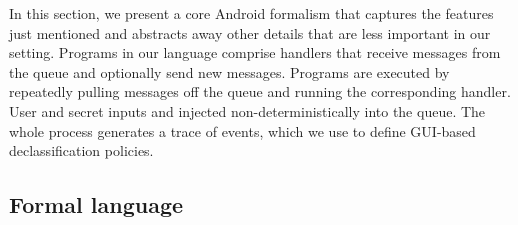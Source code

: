 \documentclass{entcs} \usepackage{entcsmacro}
\begin{document}
In this section, we present a core Android formalism that captures the
features just mentioned and abstracts away other details that are less
important in our setting.  Programs in our language comprise handlers
that receive messages from the queue and optionally send new
messages. Programs are executed by repeatedly pulling messages off the
queue and running the corresponding handler. User and secret inputs
and injected non-deterministically into the queue. The whole process
generates a trace of events, which we use to define GUI-based
declassification policies.



\subsection{Formal language}
\end{document}
